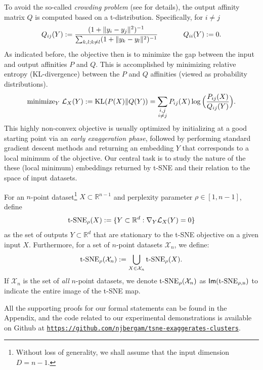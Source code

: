 To avoid the so-called \emph{crowding problem} (see \cite{van2008visualizing} for details), the output affinity matrix \(Q\) is computed based on a t-distribution. Specifically, for \(i\neq j\)
\begin{equation}
    Q_{ij}(Y) := \frac{(1 + \|y_i -y_j\|^2)^{-1}}{\sum_{k,l ; k\neq l} (1 + \|y_k-y_l\|^2)^{-1}} \hspace{0.5in}
    Q_{ii}(Y) :=0.
\end{equation}
As indicated before, the objective then is to minimize the gap between the input and output affinities $P$ and $Q$. This is accomplished by minimizing relative entropy (KL-divergence) between the \(P\) and \(Q\) affinities (viewed as probability distributions).  \[\textup{minimize}_Y \; \mathcal{L}_X(Y):= \mathrm{KL}(P(X)\|Q(Y)) = \sum_{\substack{i,j\\ i\neq j}} P_{ij}(X) \log\Big( \frac{P_{ij}(X) }  {Q_{ij}(Y)}\Big).\]
This highly non-convex objective is usually optimized by initializing at a good starting point via an \emph{early exaggeration phase}, followed by performing standard gradient descent methods and returning an embedding $Y$ that corresponds to a local minimum of the objective. Our central task is to study the nature of the these (local minimum) embeddings returned by t-SNE and their relation to the space of input datasets.
\begin{definition}
    For an $n$-point dataset\footnote{Without loss of generality, we shall assume that the input dimension $D=n-1$.} $X \subset \mathbb{R}^{n-1}$ and perplexity parameter $\rho \in [1,n-1]$, define%
    $${\operatorname*{t-SNE}}_{\rho}(X) := \{ Y \subset \mathbb{R}^d : \nabla_Y \mathcal{L}_X(Y) = 0 \} $$
    as the set of outputs $Y\subset \mathbb{R}^d$ that are stationary to the t-SNE objective on a given input $X$.
    Furthermore, for a set of $n$-point datasets $\mathcal{X}_n$, we define:
    $${\operatorname*{t-SNE}}_{\rho}(\mathcal{X}_n) := \bigcup_{X \in \mathcal{X}_n}{\operatorname*{t-SNE}}_{\rho}(X).$$
    If $\mathcal{X}_n$ is the set of \emph{all} $n$-point datasets, we denote ${\operatorname*{t-SNE}}_\rho(\mathcal{X}_n)$ as ${\operatorname*{\mathsf{Im}({\operatorname*{t-SNE}}_{\rho,n})}}$ to indicate the entire image of the t-SNE map.
\end{definition}
All the supporting proofs for our formal statements can be found in the Appendix, and the code related to our experimental demonstrations is available on Github at \href{https://github.com/njbergam/tsne-exaggerates-clusters}{\texttt{https://github.com/njbergam/tsne-exaggerates-clusters}}. %


